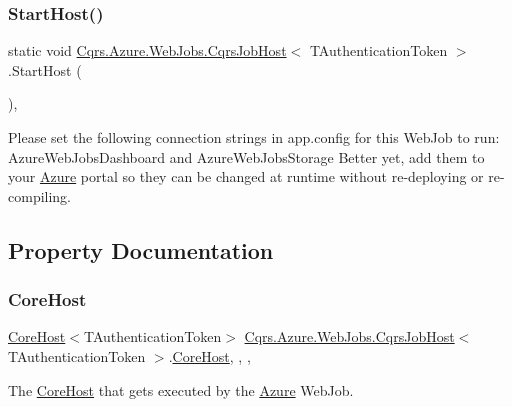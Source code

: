 \subsubsection{\texorpdfstring{Start\+Host()}{StartHost()}}
{\footnotesize\ttfamily static void \hyperlink{classCqrs_1_1Azure_1_1WebJobs_1_1CqrsJobHost}{Cqrs.\+Azure.\+Web\+Jobs.\+Cqrs\+Job\+Host}$<$ T\+Authentication\+Token $>$.Start\+Host (\begin{DoxyParamCaption}{ }\end{DoxyParamCaption})\hspace{0.3cm}{\ttfamily [static]}, {\ttfamily [protected]}}

Please set the following connection strings in app.\+config for this Web\+Job to run\+: Azure\+Web\+Jobs\+Dashboard and Azure\+Web\+Jobs\+Storage Better yet, add them to your \hyperlink{namespaceCqrs_1_1Azure}{Azure} portal so they can be changed at runtime without re-\/deploying or re-\/compiling. 

\subsection{Property Documentation}
\mbox{\label{classCqrs_1_1Azure_1_1WebJobs_1_1CqrsJobHost_a840ffdd7a98109cce3efd3ae3562941e_a840ffdd7a98109cce3efd3ae3562941e}} 
\subsubsection{\texorpdfstring{Core\+Host}{CoreHost}}
{\footnotesize\ttfamily \hyperlink{classCqrs_1_1Hosts_1_1CoreHost}{Core\+Host}$<$T\+Authentication\+Token$>$ \hyperlink{classCqrs_1_1Azure_1_1WebJobs_1_1CqrsJobHost}{Cqrs.\+Azure.\+Web\+Jobs.\+Cqrs\+Job\+Host}$<$ T\+Authentication\+Token $>$.\hyperlink{classCqrs_1_1Hosts_1_1CoreHost}{Core\+Host}\hspace{0.3cm}{\ttfamily [static]}, {\ttfamily [get]}, {\ttfamily [set]}, {\ttfamily [protected]}}



The \hyperlink{classCqrs_1_1Azure_1_1WebJobs_1_1CqrsJobHost_a840ffdd7a98109cce3efd3ae3562941e_a840ffdd7a98109cce3efd3ae3562941e}{Core\+Host} that gets executed by the \hyperlink{namespaceCqrs_1_1Azure}{Azure} Web\+Job. 

